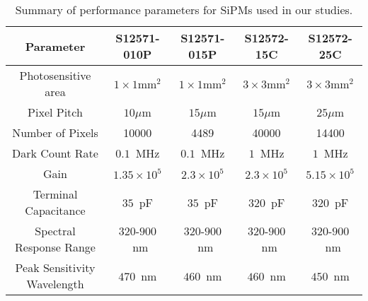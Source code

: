 \begin{table}[!ht]
\begin{center}
\caption{Summary of performance parameters for SiPMs used in our studies.}
\label{tab:SiPMParameters}
\begin{tabular}{|c|c|c|c|c|}
\hline
Parameter & S12571-010P & S12571-015P & S12572-15C & S12572-25C\\
\hline
Photosensitive area              & $1\times1\mathrm{mm}^{2}$ & $1\times1\mathrm{mm}^{2}$ & $3\times3\mathrm{mm}^{2}$ & $3\times3\mathrm{mm}^{2}$\\
Pixel Pitch                            & $10\mu$m                             & $15\mu$m                             & $15\mu$m                              & $25\mu$m\\
Number of Pixels                 &  10000                                    &  4489                                      & 40000                                     & 14400                       \\
Dark Count Rate                  &  $0.1$~MHz                            &  $0.1$~MHz                            & $1$~MHz                                 & $1$~MHz                  \\
Gain                                    & $1.35\times10^{5}$                  & $2.3\times10^{5}$                & $2.3\times10^{5}$                 & $5.15\times10^{5}$  \\
Terminal Capacitance          & $35$~pF                                 & $35$~pF                                  & $320$~pF                                & $320$~pF                  \\
Spectral Response Range     & $320$-$900$~nm                  & $320$-$900$~nm                  & $320$-$900$~nm                   & $320$-$900$~nm     \\
Peak Sensitivity Wavelength & $470$~nm                              & $460$~nm                              & $460$~nm                               & $450$~nm               \\         
\hline
\end{tabular}
\end{center}
\end{table}